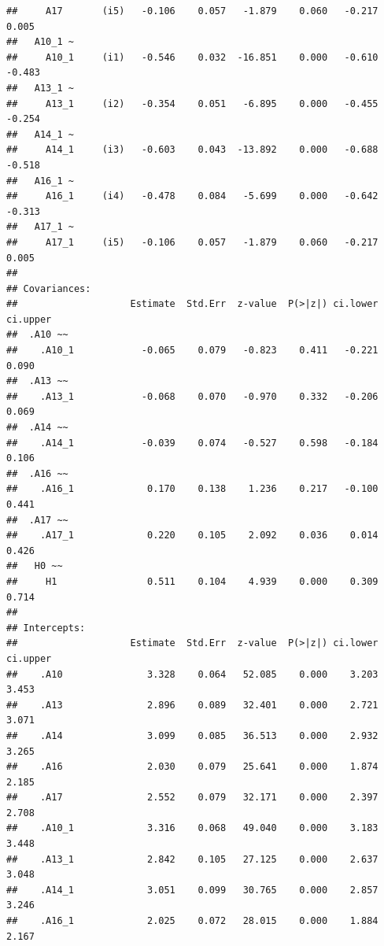 \documentclass[]{article}
\begin{document}
\begin{verbatim}
##     A17       (i5)   -0.106    0.057   -1.879    0.060   -0.217    0.005
##   A10_1 ~                                                               
##     A10_1     (i1)   -0.546    0.032  -16.851    0.000   -0.610   -0.483
##   A13_1 ~                                                               
##     A13_1     (i2)   -0.354    0.051   -6.895    0.000   -0.455   -0.254
##   A14_1 ~                                                               
##     A14_1     (i3)   -0.603    0.043  -13.892    0.000   -0.688   -0.518
##   A16_1 ~                                                               
##     A16_1     (i4)   -0.478    0.084   -5.699    0.000   -0.642   -0.313
##   A17_1 ~                                                               
##     A17_1     (i5)   -0.106    0.057   -1.879    0.060   -0.217    0.005
## 
## Covariances:
##                    Estimate  Std.Err  z-value  P(>|z|) ci.lower ci.upper
##  .A10 ~~                                                                
##    .A10_1            -0.065    0.079   -0.823    0.411   -0.221    0.090
##  .A13 ~~                                                                
##    .A13_1            -0.068    0.070   -0.970    0.332   -0.206    0.069
##  .A14 ~~                                                                
##    .A14_1            -0.039    0.074   -0.527    0.598   -0.184    0.106
##  .A16 ~~                                                                
##    .A16_1             0.170    0.138    1.236    0.217   -0.100    0.441
##  .A17 ~~                                                                
##    .A17_1             0.220    0.105    2.092    0.036    0.014    0.426
##   H0 ~~                                                                 
##     H1                0.511    0.104    4.939    0.000    0.309    0.714
## 
## Intercepts:
##                    Estimate  Std.Err  z-value  P(>|z|) ci.lower ci.upper
##    .A10               3.328    0.064   52.085    0.000    3.203    3.453
##    .A13               2.896    0.089   32.401    0.000    2.721    3.071
##    .A14               3.099    0.085   36.513    0.000    2.932    3.265
##    .A16               2.030    0.079   25.641    0.000    1.874    2.185
##    .A17               2.552    0.079   32.171    0.000    2.397    2.708
##    .A10_1             3.316    0.068   49.040    0.000    3.183    3.448
##    .A13_1             2.842    0.105   27.125    0.000    2.637    3.048
##    .A14_1             3.051    0.099   30.765    0.000    2.857    3.246
##    .A16_1             2.025    0.072   28.015    0.000    1.884    2.167

\end{verbatim}
\end{document}
